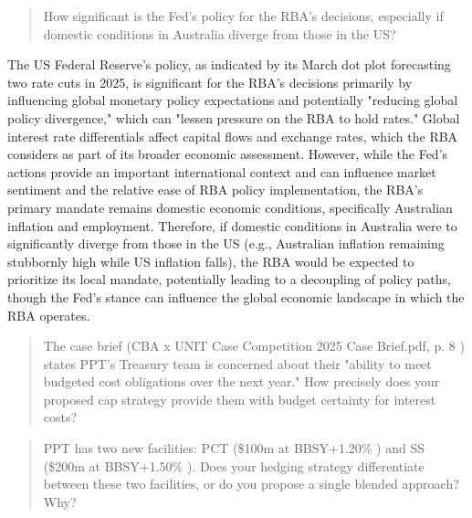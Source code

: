 \documentclass[11pt, a4paper, british]{article}
\begin{document}
\newpage

\begin{quote}
    How significant is the Fed's policy for the RBA's decisions, especially if domestic conditions in Australia diverge from those in the US?
\end{quote}

The US Federal Reserve's policy, as indicated by its March dot plot forecasting two rate cuts in 2025, is significant for the RBA's decisions primarily by influencing global monetary policy expectations and potentially "reducing global policy divergence," which can "lessen pressure on the RBA to hold rates." Global interest rate differentials affect capital flows and exchange rates, which the RBA considers as part of its broader economic assessment. However, while the Fed's actions provide an important international context and can influence market sentiment and the relative ease of RBA policy implementation, the RBA's primary mandate remains domestic economic conditions, specifically Australian inflation and employment. Therefore, if domestic conditions in Australia were to significantly diverge from those in the US (e.g., Australian inflation remaining stubbornly high while US inflation falls), the RBA would be expected to prioritize its local mandate, potentially leading to a decoupling of policy paths, though the Fed's stance can influence the global economic landscape in which the RBA operates.  

\newpage

\begin{quote}
    The case brief (CBA x UNIT Case Competition 2025 Case Brief.pdf, p. 8 ) states PPT's Treasury team is concerned about their "ability to meet budgeted cost obligations over the next year." How precisely does your proposed cap strategy provide them with budget certainty for interest costs?
\end{quote}

\newpage

\begin{quote}
    PPT has two new facilities: PCT (\$100m at BBSY+1.20\% ) and SS (\$200m at BBSY+1.50\% ). Does your hedging strategy differentiate between these two facilities, or do you propose a single blended approach? Why?
\end{quote}
\end{document}
